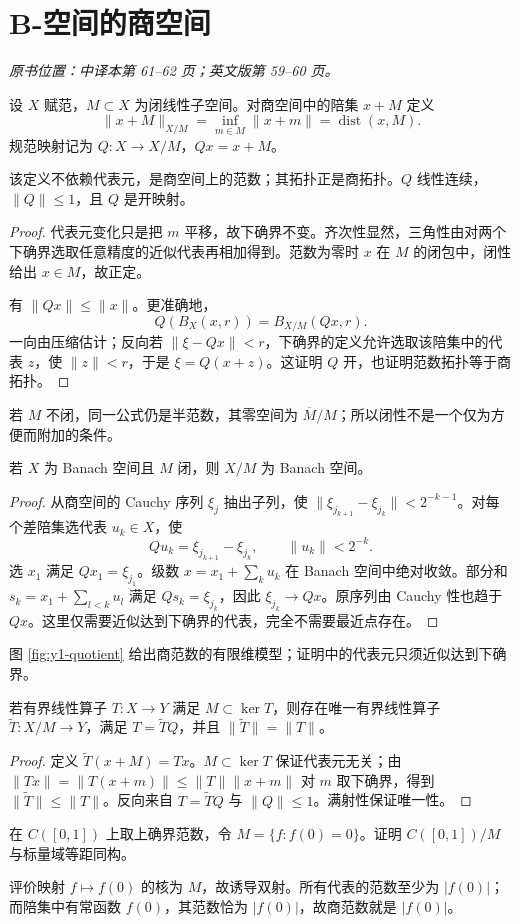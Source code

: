 \section{B-空间的商空间}\label{sec:yosida-01-11}
\noindent\textit{原书位置：中译本第 61--62 页；英文版第 59--60 页。}

\begin{definition}[商范数]
设 $X$ 赋范，$M\subset X$ 为闭线性子空间。对商空间中的陪集 $x+M$ 定义
\[
 \|x+M\|_{X/M}=\inf_{m\in M}\|x+m\|=\operatorname{dist}(x,M).
\]
规范映射记为 $Q:X\to X/M$，$Qx=x+M$。
\end{definition}
\begin{proposition}\label{prop:y1-quotient-norm}
该定义不依赖代表元，是商空间上的范数；其拓扑正是商拓扑。$Q$ 线性连续，$\|Q\|\le1$，且 $Q$ 是开映射。
\end{proposition}
\begin{proof}
代表元变化只是把 $m$ 平移，故下确界不变。齐次性显然，三角性由对两个下确界选取任意精度的近似代表再相加得到。范数为零时 $x$ 在 $M$ 的闭包中，闭性给出 $x\in M$，故正定。

有 $\|Qx\|\le\|x\|$。更准确地，
\[
 Q(B_X(x,r))=B_{X/M}(Qx,r).
\]
一向由压缩估计；反向若 $\|\xi-Qx\|<r$，下确界的定义允许选取该陪集中的代表 $z$，使 $\|z\|<r$，于是 $\xi=Q(x+z)$。这证明 $Q$ 开，也证明范数拓扑等于商拓扑。
\end{proof}
若 $M$ 不闭，同一公式仍是半范数，其零空间为 $\overline M/M$；所以闭性不是一个仅为方便而附加的条件。

\begin{theorem}\label{thm:y1-quotient-complete}
若 $X$ 为 Banach 空间且 $M$ 闭，则 $X/M$ 为 Banach 空间。
\end{theorem}
\begin{proof}
从商空间的 Cauchy 序列 $\xi_j$ 抽出子列，使 $\|\xi_{j_{k+1}}-\xi_{j_k}\|<2^{-k-1}$。对每个差陪集选代表 $u_k\in X$，使
\[
 Qu_k=\xi_{j_{k+1}}-\xi_{j_k},\qquad\|u_k\|<2^{-k}.
\]
选 $x_1$ 满足 $Qx_1=\xi_{j_1}$。级数 $x=x_1+\sum_ku_k$ 在 Banach 空间中绝对收敛。部分和 $s_k=x_1+\sum_{l<k}u_l$ 满足 $Qs_k=\xi_{j_k}$，因此 $\xi_{j_k}\to Qx$。原序列由 Cauchy 性也趋于 $Qx$。这里仅需要近似达到下确界的代表，完全不需要最近点存在。
\end{proof}

图 \ref{fig:y1-quotient} 给出商范数的有限维模型；证明中的代表元只须近似达到下确界。



\begin{proposition}[补充：经商空间分解算子]
若有界线性算子 $T:X\to Y$ 满足 $M\subset\ker T$，则存在唯一有界线性算子 $\widetilde T:X/M\to Y$，满足 $T=\widetilde TQ$，并且 $\|\widetilde T\|=\|T\|$。
\end{proposition}
\begin{proof}
定义 $\widetilde T(x+M)=Tx$。$M\subset\ker T$ 保证代表元无关；由 $\|Tx\|=\|T(x+m)\|\le\|T\|\|x+m\|$ 对 $m$ 取下确界，得到 $\|\widetilde T\|\le\|T\|$。反向来自 $T=\widetilde TQ$ 与 $\|Q\|\le1$。满射性保证唯一性。
\end{proof}

\begin{exercise}[补充：商空间的具体计算]
在 $C([0,1])$ 上取上确界范数，令 $M=\{f:f(0)=0\}$。证明 $C([0,1])/M$ 与标量域等距同构。
\end{exercise}
\begin{solution}
评价映射 $f\mapsto f(0)$ 的核为 $M$，故诱导双射。所有代表的范数至少为 $|f(0)|$；而陪集中有常函数 $f(0)$，其范数恰为 $|f(0)|$，故商范数就是 $|f(0)|$。
\end{solution}
